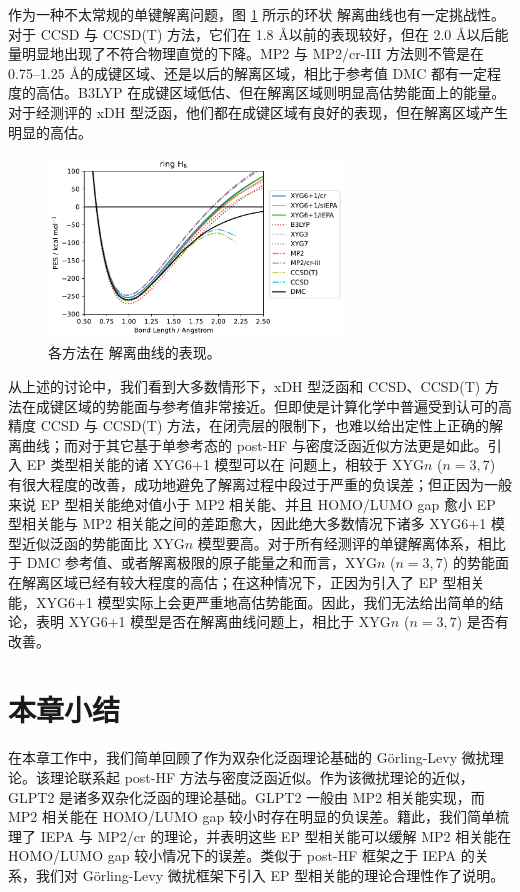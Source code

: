 作为一种不太常规的单键解离问题，图 \ref{fig.2.curve-H6} 所示的环状  解离曲线也有一定挑战性。对于 CCSD 与 CCSD(T) 方法，它们在 1.8 \AA 以前的表现较好，但在 2.0 \AA 以后能量明显地出现了不符合物理直觉的下降。MP2 与 MP2/cr-III 方法则不管是在 0.75--1.25 \AA 的成键区域、还是以后的解离区域，相比于参考值 DMC 都有一定程度的高估。B3LYP 在成键区域低估、但在解离区域则明显高估势能面上的能量。对于经测评的 xDH 型泛函，他们都在成键区域有良好的表现，但在解离区域产生明显的高估。

\begin{figure}[t]
  \centering
  \includegraphics[width=0.7\textwidth]{assets/curve-H6.pdf}
  \caption[ 解离曲线表现]{各方法在  解离曲线的表现。}
  \label{fig.2.curve-H6}
\end{figure}

从上述的讨论中，我们看到大多数情形下，xDH 型泛函和 CCSD、CCSD(T) 方法在成键区域的势能面与参考值非常接近。但即使是计算化学中普遍受到认可的高精度 CCSD 与 CCSD(T) 方法，在闭壳层的限制下，也难以给出定性上正确的解离曲线；而对于其它基于单参考态的 post-HF 与密度泛函近似方法更是如此。引入 EP 类型相关能的诸 XYG6+1 模型可以在  问题上，相较于 XYG$n$ ($n=3,7$) 有很大程度的改善，成功地避免了解离过程中段过于严重的负误差；但正因为一般来说 EP 型相关能绝对值小于 MP2 相关能、并且 HOMO/LUMO gap 愈小 EP 型相关能与 MP2 相关能之间的差距愈大，因此绝大多数情况下诸多 XYG6+1 模型近似泛函的势能面比 XYG$n$ 模型要高。对于所有经测评的单键解离体系，相比于 DMC 参考值、或者解离极限的原子能量之和而言，XYG$n$ ($n=3,7$) 的势能面在解离区域已经有较大程度的高估；在这种情况下，正因为引入了 EP 型相关能，XYG6+1 模型实际上会更严重地高估势能面。因此，我们无法给出简单的结论，表明 XYG6+1 模型是否在解离曲线问题上，相比于 XYG$n$ ($n=3,7$) 是否有改善。

\section{本章小结}

在本章工作中，我们简单回顾了作为双杂化泛函理论基础的 G\"orling-Levy 微扰理论。该理论联系起 post-HF 方法与密度泛函近似。作为该微扰理论的近似，GLPT2 是诸多双杂化泛函的理论基础。GLPT2 一般由 MP2 相关能实现，而 MP2 相关能在 HOMO/LUMO gap 较小时存在明显的负误差。籍此，我们简单梳理了 IEPA 与 MP2/cr 的理论，并表明这些 EP 型相关能可以缓解 MP2 相关能在 HOMO/LUMO gap 较小情况下的误差。类似于 post-HF 框架之于 IEPA 的关系，我们对 G\"orling-Levy 微扰框架下引入 EP 型相关能的理论合理性作了说明。

